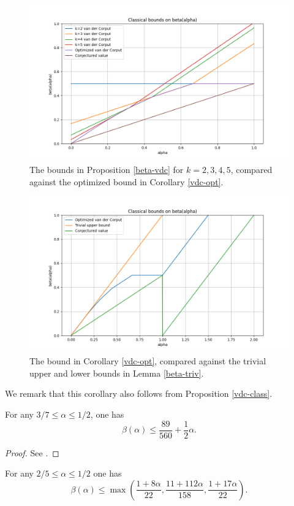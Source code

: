 \begin{figure}
    \centering
    \includegraphics[width=0.5\linewidth]{chapter/van_der_corput_beta.png}
    \caption{The bounds in Proposition \ref{beta-vdc} for $k=2,3,4,5$, compared against the optimized bound in Corollary \ref{vdc-opt}.}
    \label{fig:vdc}
\end{figure}

\begin{figure}
    \centering
    \includegraphics[width=0.5\linewidth]{chapter/van_der_corput_beta_vs_conjectured.png}
    \caption{The bound in Corollary \ref{vdc-opt}, compared against the trivial upper and lower bounds in Lemma \ref{beta-triv}.}
    \label{fig:vdc2}
\end{figure}

We remark that this corollary also follows from Proposition \ref{vdc-class}.



\begin{theorem}\label{beta-Watt} For any $3/7 \le \alpha \le 1/2$, one has
    \[
    \beta(\alpha) \le \frac{89}{560} + \frac{1}{2}\alpha.
    \]
    \end{theorem}


\literature
{}

    \begin{proof}
    See \cite[Theorem~5]{watt_exponential_1989}.
    \end{proof}



\begin{theorem}\label{beta-HK2}  For any $2/5 \le \alpha \le 1/2$ one has
\[
\beta(\alpha) \le \max\left(\frac{1 + 8\alpha}{22}, \frac{11 + 112\alpha}{158}, \frac{1 + 17\alpha}{22}\right).
\]
\end{theorem}


